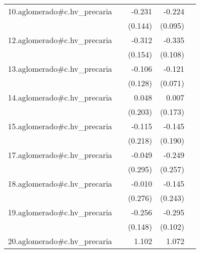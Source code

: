 {\begin{longtable}{l*{4}{D{.}{.}{-1}}}
\addlinespace
10.aglomerado#c.hv\_precaria&                     &      -0.231         &      -0.224\sym{*}  &                     \\
            &                     &     (0.144)         &     (0.095)         &                     \\
\addlinespace
12.aglomerado#c.hv\_precaria&                     &      -0.312\sym{*}  &      -0.335\sym{**} &                     \\
            &                     &     (0.154)         &     (0.108)         &                     \\
\addlinespace
13.aglomerado#c.hv\_precaria&                     &      -0.106         &      -0.121         &                     \\
            &                     &     (0.128)         &     (0.071)         &                     \\
\addlinespace
14.aglomerado#c.hv\_precaria&                     &       0.048         &       0.007         &                     \\
            &                     &     (0.203)         &     (0.173)         &                     \\
\addlinespace
15.aglomerado#c.hv\_precaria&                     &      -0.115         &      -0.145         &                     \\
            &                     &     (0.218)         &     (0.190)         &                     \\
\addlinespace
17.aglomerado#c.hv\_precaria&                     &      -0.049         &      -0.249         &                     \\
            &                     &     (0.295)         &     (0.257)         &                     \\
\addlinespace
18.aglomerado#c.hv\_precaria&                     &      -0.010         &      -0.145         &                     \\
            &                     &     (0.276)         &     (0.243)         &                     \\
\addlinespace
19.aglomerado#c.hv\_precaria&                     &      -0.256         &      -0.295\sym{**} &                     \\
            &                     &     (0.148)         &     (0.102)         &                     \\
\addlinespace
20.aglomerado#c.hv\_precaria&                     &       1.102\sym{**} &       1.072\sym{**} &                     \\

\end{longtable}}
